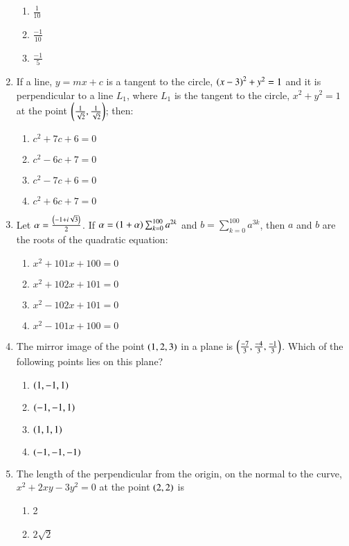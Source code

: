 \documentclass[journal,12pt,onecolumn]{IEEEtran}
\theoremstyle{remark}
\begin{document}
\begin{enumerate}
\begin{enumerate}
        \item $\frac{1}{10}$
        \item $\frac{-1}{10}$
        \item $\frac{-1}{5}$
    \end{enumerate}
    \item If a line, $y= mx + c$ is a tangent to the circle, $\left(x - 3\right)^2 + y^2 = 1$ and it is perpendicular to a line $L_1$, where $L_1$ is the tangent to the circle, $x^2 + y^2 = 1$ at the point $\left( \frac{1}{\sqrt{2}} , \frac{1}{\sqrt{2}}\right)$; then:
    \begin{enumerate}
        \item $c^2 + 7c + 6 = 0 $
        \item $c^2 - 6c + 7 = 0 $
        \item $c^2 - 7c + 6 = 0 $
        \item $c^2 + 6c + 7 = 0 $
    \end{enumerate}
    \item Let $\alpha=\frac{\left(-1+i\sqrt{3}\right)}{2}$. If $\alpha=\left(1+\alpha\right)\sum_{k=0}^{100}a^{2k}$ and $b=\sum_{k=0}^{100} a^{3k}$, then $a$ and $b$ are the roots of the quadratic equation:
    \begin{enumerate}
        \item $x^2+101x+100=0$
        \item $x^2+102x+101=0$
        \item $x^2-102x+101=0$
        \item $x^2-101x+100=0$
    \end{enumerate}
    \item  The mirror image of the point $\left(1, 2, 3\right)$ in a plane is $\left(\frac{-7}{3}, \frac{-4}{3} , \frac{-1}{3} \right)$. Which of the following points lies on this plane?
    \begin{enumerate}
        \item $\left(1,-1,1\right)$
         \item $\left(-1,-1,1\right)$
          \item $\left(1,1,1\right)$
         \item $\left(-1,-1,-1\right)$  
    \end{enumerate}
    \item The length of the perpendicular from the origin, on the normal to the curve,$x^2 + 2xy - 3y^2 = 0$ at the point $\left(2, 2\right)$ is
    \begin{enumerate}
        \item 2
        \item $2\sqrt{2}$

\end{enumerate}
\end{enumerate}
\end{document}
